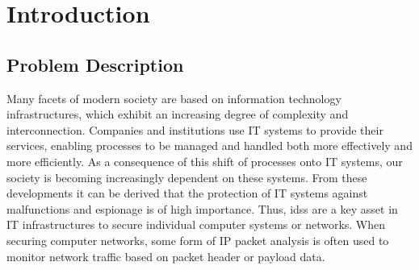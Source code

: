 \documentclass[../../main.tex]{subfiles}
\begin{document}
\chapter{Introduction}

\newpage
\section{Problem Description}

Many facets of modern society are based on information technology infrastructures, which exhibit an increasing degree of complexity and interconnection. Companies and institutions use IT systems to provide their services, enabling processes to be managed and handled both more effectively and more efficiently. As a consequence of this shift of processes onto IT systems, our society is becoming increasingly dependent on these systems. From these developments it can be derived that the protection of IT systems against malfunctions and espionage is of high importance. Thus, \glspl{ids} are a key asset in IT infrastructures to secure individual computer systems or networks. When securing computer networks, some form of IP packet analysis is often used to monitor network traffic based on packet header or payload data.
\end{document}
